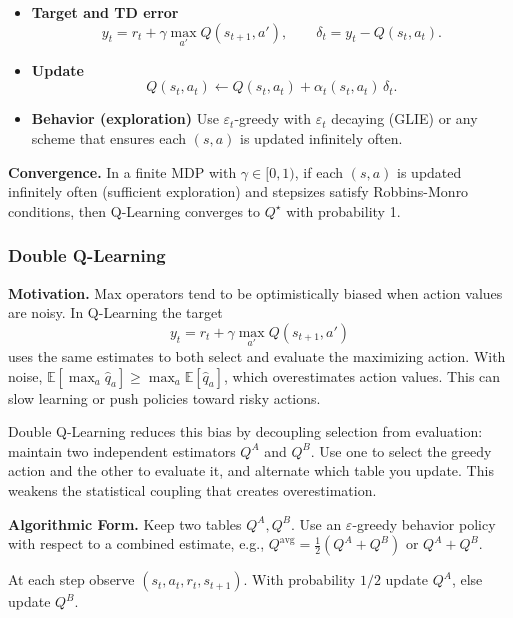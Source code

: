 \documentclass[
]{book}
\theoremstyle{definition}
\theoremstyle{definition}
\theoremstyle{definition}
\theoremstyle{definition}
\theoremstyle{remark}
\begin{document}
\begin{itemize}
\item
  \textbf{Target and TD error}
  \[
  y_t = r_{t} + \gamma \max_{a'} Q(s_{t+1}, a'), \qquad
  \delta_t = y_t - Q(s_t, a_t).
  \]
\item
  \textbf{Update}
  \[
  Q(s_t, a_t) \leftarrow Q(s_t, a_t) + \alpha_t(s_t,a_t)\, \delta_t.
  \]
\item
  \textbf{Behavior (exploration)}
  Use \(\varepsilon_t\)-greedy with \(\varepsilon_t\) decaying (GLIE) or any scheme that ensures each \((s,a)\) is updated infinitely often.
\end{itemize}

\textbf{Convergence.} In a finite MDP with \(\gamma \in [0,1)\), if each \((s,a)\) is updated infinitely often (sufficient exploration) and stepsizes satisfy Robbins-Monro conditions, then Q-Learning converges to \(Q^\star\) with probability 1.

\subsubsection{Double Q-Learning}\label{double-q-learning}

\textbf{Motivation.} Max operators tend to be optimistically biased when action values are noisy. In Q-Learning the target
\[
y_t = r_{t} + \gamma \max_{a'} Q(s_{t+1}, a')
\]
uses the same estimates to both select and evaluate the maximizing action. With noise, \(\mathbb E[\max_a \hat q_a] \ge \max_a \mathbb E[\hat q_a]\), which overestimates action values. This can slow learning or push policies toward risky actions.

Double Q-Learning reduces this bias by decoupling selection from evaluation: maintain two independent estimators \(Q^A\) and \(Q^B\). Use one to select the greedy action and the other to evaluate it, and alternate which table you update. This weakens the statistical coupling that creates overestimation.

\textbf{Algorithmic Form.} Keep two tables \(Q^A, Q^B\). Use an \(\varepsilon\)-greedy behavior policy with respect to a combined estimate, e.g., \(Q^{\text{avg}}= \tfrac12(Q^A+Q^B)\) or \(Q^A+Q^B\).

At each step observe \((s_t, a_t, r_{t}, s_{t+1})\). With probability \(1/2\) update \(Q^A\), else update \(Q^B\).
\end{document}
